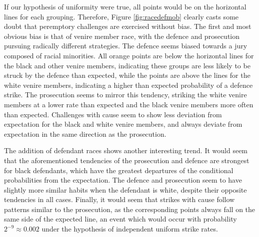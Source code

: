 \documentclass[12pt]{article}
\begin{document}
If our hypothesis of uniformity were true, all points would be on the horizontal lines for each grouping. Therefore, Figure \ref{fig:racedefmob} clearly casts some doubt that peremptory challenges are exercised without bias. The first and most obvious bias is that of venire member race, with the defence and prosecution pursuing radically different strategies. The defence seems biased towards a jury composed of racial minorities. All orange points are below the horizontal lines for the black and other venire members, indicating these groups are less likely to be struck by the defence than expected, while the points are above the lines for the white venire members, indicating a higher than expected probability of a defence strike. The prosecution seems to mirror this tendency, striking the white venire members at a lower rate than expected and the black venire members more often than expected. Challenges with cause seem to show less deviation from expectation for the black and white venire members, and always deviate from expectation in the same direction as the prosecution.

The addition of defendant races shows another interesting trend. It would seem that the aforementioned tendencies of the prosecution and defence are strongest for black defendants, which have the greatest departures of the conditional probabilities from the expectation. The defence and prosecution seem to have slightly more similar habits when the defendant is white, despite their opposite tendencies in all cases. Finally, it would seem that strikes with cause follow patterns similar to the prosecution, as the corresponding points always fall on the same side of the expected line, an event which would occur with probability $2^{-9} \approx 0.002$ under the hypothesis of independent uniform strike rates.
\end{document}
